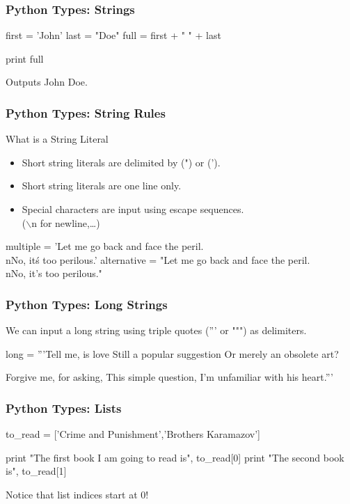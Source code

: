 \begin{frame}[fragile]
\frametitle{Python Types: Strings}

\begin{python}
first = 'John'
last = "Doe"
full = first + " " + last

print full
\end{python}

\pause
Outputs \alert{John Doe}.
\end{frame}

\begin{frame}[fragile]
\frametitle{Python Types: String Rules}

\begin{block}{What is a String Literal}
\begin{itemize}
\item Short string literals are delimited by (") or (').
\item Short string literals are one line only.
\item Special characters are input using escape sequences.\\
        ($\backslash$n for newline,\ldots)
\end{itemize}
\end{block}

\begin{python}
multiple = 'Let  me go back and face the peril.\\nNo, it\'s too perilous.'
alternative = "Let  me go back and face the peril.\\nNo, it's too perilous."
\end{python}
\end{frame}

\begin{frame}[fragile]
\frametitle{Python Types: Long Strings}

We can input a long string using triple quotes (''' or """) as delimiters.

\begin{python}
long = '''Tell me, is love
Still a popular suggestion
Or merely an obsolete art?

Forgive me, for asking,
This simple question,
I'm unfamiliar with his heart.'''
\end{python}
\end{frame}

\begin{frame}[fragile]
\frametitle{Python Types: Lists}
\begin{python}
to_read = ['Crime and Punishment','Brothers Karamazov']

print "The first book I am going to read is", to_read[0]
print "The second book is", to_read[1]

\end{python}

Notice that list indices start at \alert{0}!

\end{frame}


